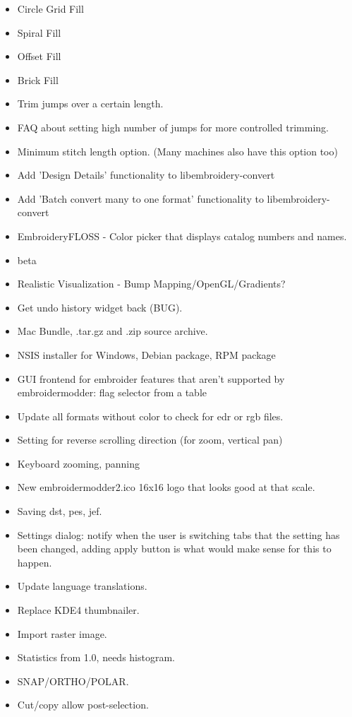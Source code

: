 \documentclass[10pt]{report}
\begin{document}
\begin{itemize}
  \item Circle Grid Fill
  \item Spiral Fill
  \item Offset Fill
  \item Brick Fill
  \item Trim jumps over a certain length.
  \item FAQ about setting high number of jumps for more controlled trimming.
  \item Minimum stitch length option. (Many machines also have this option too)
  \item Add 'Design Details' functionality to libembroidery-convert
  \item Add 'Batch convert many to one format' functionality to libembroidery-convert
  \item EmbroideryFLOSS - Color picker that displays catalog numbers and names.
\item beta
  \item Realistic Visualization - Bump Mapping/OpenGL/Gradients?
  \item Get undo history widget back (BUG).
  \item Mac Bundle, .tar.gz and .zip source archive.
  \item NSIS installer for Windows, Debian package, RPM package
  \item GUI frontend for embroider features that aren't supported by embroidermodder: flag selector from a table
  \item Update all formats without color to check for edr or rgb files.
  \item Setting for reverse scrolling direction (for zoom, vertical pan)
  \item Keyboard zooming, panning
  \item New embroidermodder2.ico 16x16 logo that looks good at that scale.
  \item Saving dst, pes, jef.
  \item Settings dialog: notify when the user is switching tabs that the setting has been changed, adding apply button is what would make sense for this to happen.
  \item Update language translations.
  \item Replace KDE4 thumbnailer.
  \item Import raster image.
  \item Statistics from 1.0, needs histogram.
  \item SNAP/ORTHO/POLAR.
  \item Cut/copy allow post-selection.

\end{itemize}
\end{document}

